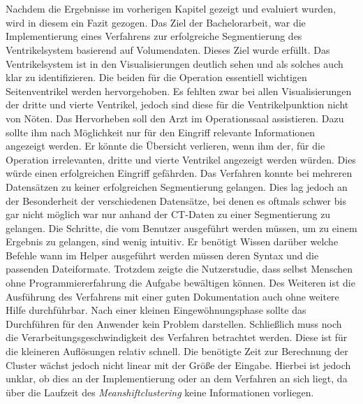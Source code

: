 \chapter{}
\label{sec:discussion}


Nachdem die Ergebnisse im vorherigen Kapitel gezeigt und evaluiert wurden, wird in diesem ein Fazit gezogen.
\newline
Das Ziel der Bachelorarbeit, war die Implementierung eines Verfahrens zur erfolgreiche Segmentierung des Ventrikelsystem basierend auf Volumendaten. Dieses Ziel wurde erfüllt.
\newline
Das Ventrikelsystem ist in den Visualisierungen deutlich sehen und als solches auch klar zu identifizieren. Die beiden für die Operation essentiell wichtigen Seitenventrikel werden hervorgehoben.
Es fehlten zwar bei allen Visualisierungen der dritte und vierte Ventrikel, jedoch sind diese für die Ventrikelpunktion nicht von Nöten. Das Hervorheben soll den Arzt im Operationssaal assistieren. Dazu sollte ihm nach Möglichkeit nur für den Eingriff relevante Informationen angezeigt werden. Er könnte die  Übersicht verlieren, wenn ihm der, für die Operation irrelevanten, dritte und vierte Ventrikel angezeigt werden würden. Dies würde einen erfolgreichen Eingriff gefährden.
\newline
Das Verfahren konnte bei mehreren Datensätzen zu keiner erfolgreichen Segmentierung gelangen. Dies lag jedoch an der Besonderheit der verschiedenen Datensätze, bei denen es oftmals schwer bis gar nicht möglich war nur anhand der CT-Daten zu einer Segmentierung zu gelangen.
\newline
Die Schritte, die vom Benutzer ausgeführt werden müssen, um zu einem Ergebnis zu gelangen, sind wenig intuitiv. Er benötigt Wissen darüber welche Befehle wann im Helper ausgeführt werden müssen deren Syntax und die passenden Dateiformate.
\newline
Trotzdem zeigte die Nutzerstudie, dass selbst Menschen ohne Programmiererfahrung die Aufgabe bewältigen können. Des Weiteren ist die Ausführung des Verfahrens mit einer guten Dokumentation auch ohne weitere Hilfe durchführbar. Nach einer kleinen Eingewöhnungsphase sollte das Durchführen für den Anwender kein Problem darstellen.
\newline
Schließlich muss noch die Verarbeitungsgeschwindigkeit des Verfahren betrachtet werden. Diese ist für die kleineren Auflösungen relativ schnell. Die benötigte Zeit zur Berechnung der Cluster wächst jedoch nicht linear mit der Größe der Eingabe. Hierbei ist jedoch unklar, ob dies an der Implementierung oder an dem Verfahren an sich liegt, da über die Laufzeit des \textit{Meanshiftclustering} keine Informationen vorliegen.


